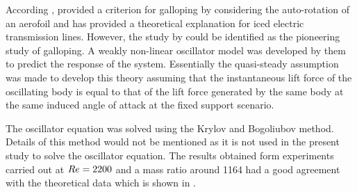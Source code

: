 According \cite{Paidoussis2010}, \cite{Glauert1919} provided a criterion for galloping by considering the auto-rotation of an aerofoil and \cite{DenHartog1956} has provided a theoretical explanation for iced electric transmission lines. However, the study by \cite{Parkinson1964} could be identified as the pioneering study of galloping. A weakly non-linear oscillator model was developed by them to predict the response of the system. Essentially the quasi-steady assumption was made to develop this theory assuming that the instantaneous lift force of the oscillating body is equal to that of the lift force generated by the same body at the same induced angle of attack at the fixed support scenario.








The oscillator equation was solved using the Krylov and Bogoliubov method. Details of this method would not be mentioned as it is not used in the present study to solve the oscillator equation. The results obtained form experiments carried out at $Re=2200$ and a mass ratio around 1164 had a good agreement with the theoretical data which is shown in .

  


    

     










